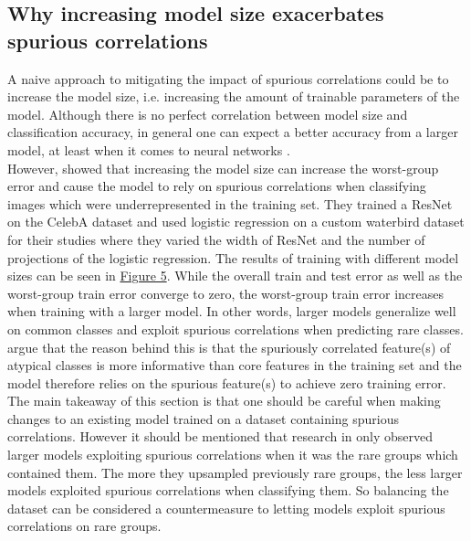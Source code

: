 \documentclass{article}
\begin{document}
\subsection{Why increasing model size exacerbates spurious correlations}
A naive approach to mitigating the impact of spurious correlations could be to increase the model size, i.e. increasing
the amount of trainable parameters of the model. Although there is no perfect correlation between model size and
classification accuracy, in general one can expect a better accuracy from a larger model, at least when it comes
to neural networks \cite{8395231}. \\
However, \cite{pmlr-v119-sagawa20a} showed that increasing the model size can increase the worst-group error 
and cause the model to rely on spurious correlations when classifying images which were underrepresented in the training set. 
They trained a ResNet \cite{He_2016_CVPR} on the CelebA dataset \cite{liu2015faceattributes} and used logistic regression
on a custom waterbird dataset for their studies where they varied the width of ResNet and the number of projections of the
logistic regression. The results of training with different model sizes can be seen in \hyperref[fig:sagawaImg]{Figure 5}. 
While the overall train and test error as well as the worst-group train error converge to zero, the worst-group train error
increases when training with a larger model. In other words, larger models generalize well on common classes and exploit
spurious correlations when predicting rare classes. \cite{pmlr-v119-sagawa20a} argue that the reason behind this is that the spuriously
correlated feature(s) of atypical classes is more informative than core features in the training set and the model therefore
relies on the spurious feature(s) to achieve zero training error. \\
The main takeaway of this section is that one should be careful when making changes to an existing model trained
on a dataset containing spurious correlations. However it should be mentioned that research in \cite{pmlr-v119-sagawa20a} only observed larger models 
exploiting spurious correlations when it was the rare groups which contained them. The more they upsampled previously rare groups, 
the less larger models exploited spurious correlations when classifying them. So balancing the dataset can be considered a
countermeasure to letting models exploit spurious correlations on rare groups.
\end{document}
